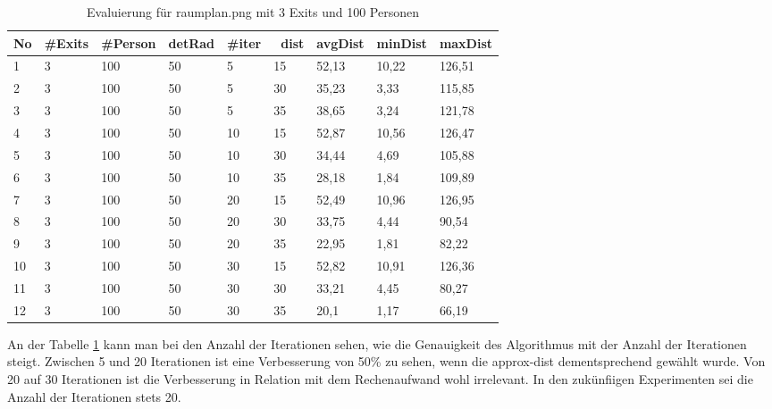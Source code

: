 \begin{table}[h]
\begin{tabular}{|l|l|l|l|l|l|l|l|l|}
\hline
No & \#Exits & \#Person & detRad & \#iter & ~dist & avgDist & minDist & maxDist \\ \hline
1  & 3       & 100      & 50     & 5      & 15    & 52,13   & 10,22   & 126,51  \\ \hline
2  & 3       & 100      & 50     & 5      & 30    & 35,23   & 3,33    & 115,85  \\ \hline
3  & 3       & 100      & 50     & 5      & 35    & 38,65   & 3,24    & 121,78  \\ \hline
4  & 3       & 100      & 50     & 10     & 15    & 52,87   & 10,56   & 126,47  \\ \hline
5  & 3       & 100      & 50     & 10     & 30    & 34,44   & 4,69    & 105,88  \\ \hline
6  & 3       & 100      & 50     & 10     & 35    & 28,18   & 1,84    & 109,89  \\ \hline
7  & 3       & 100      & 50     & 20     & 15    & 52,49   & 10,96   & 126,95  \\ \hline
8  & 3       & 100      & 50     & 20     & 30    & 33,75   & 4,44    & 90,54   \\ \hline
9  & 3       & 100      & 50     & 20     & 35    & 22,95   & 1,81    & 82,22   \\ \hline
10 & 3       & 100      & 50     & 30     & 15    & 52,82   & 10,91   & 126,36  \\ \hline
11 & 3       & 100      & 50     & 30     & 30    & 33,21   & 4,45    & 80,27   \\ \hline
12 & 3       & 100      & 50     & 30     & 35    & 20,1    & 1,17    & 66,19   \\ \hline
\end{tabular}
\caption{Evaluierung für raumplan.png mit 3 Exits und 100 Personen}
\label{fig:eva01}
\end{table}

An der Tabelle \ref{fig:eva01} kann man bei den Anzahl der Iterationen sehen, wie die Genauigkeit des Algorithmus mit der Anzahl der Iterationen steigt. Zwischen 5 und 20 Iterationen ist eine Verbesserung von 50\% zu sehen, wenn die approx-dist dementsprechend gewählt wurde. Von 20 auf 30 Iterationen ist die Verbesserung in Relation mit dem Rechenaufwand wohl irrelevant. In den zukünfiigen Experimenten sei die Anzahl der Iterationen stets 20.


